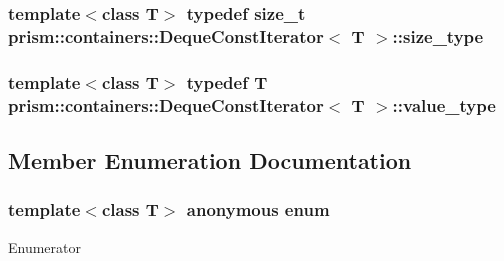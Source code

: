 \subsubsection[{\texorpdfstring{size\+\_\+type}{size_type}}]{\setlength{\rightskip}{0pt plus 5cm}template$<$class T$>$ typedef size\+\_\+t {\bf prism\+::containers\+::\+Deque\+Const\+Iterator}$<$ T $>$\+::{\bf size\+\_\+type}}\hypertarget{classprism_1_1containers_1_1_deque_const_iterator_a30b8ab79e1eb12d4b6f82dd9782ea216}{}\label{classprism_1_1containers_1_1_deque_const_iterator_a30b8ab79e1eb12d4b6f82dd9782ea216}
\subsubsection[{\texorpdfstring{value\+\_\+type}{value_type}}]{\setlength{\rightskip}{0pt plus 5cm}template$<$class T$>$ typedef T {\bf prism\+::containers\+::\+Deque\+Const\+Iterator}$<$ T $>$\+::{\bf value\+\_\+type}}\hypertarget{classprism_1_1containers_1_1_deque_const_iterator_a094727b1488122c12004cf255f3c8695}{}\label{classprism_1_1containers_1_1_deque_const_iterator_a094727b1488122c12004cf255f3c8695}


\subsection{Member Enumeration Documentation}
\subsubsection[{\texorpdfstring{anonymous enum}{anonymous enum}}]{\setlength{\rightskip}{0pt plus 5cm}template$<$class T$>$ anonymous enum}\hypertarget{classprism_1_1containers_1_1_deque_const_iterator_a6e21cb16d5a220121ed16fdd4cabe84a}{}\label{classprism_1_1containers_1_1_deque_const_iterator_a6e21cb16d5a220121ed16fdd4cabe84a}
\begin{Desc}
\item[Enumerator]\par
\begin{description}
\item[{\em 
C\+H\+U\+N\+K\+\_\+\+S\+I\+ZE\hypertarget{classprism_1_1containers_1_1_deque_const_iterator_a6e21cb16d5a220121ed16fdd4cabe84aa1aa5bd9c4d095a95b3354c4cbd7b9880}{}\label{classprism_1_1containers_1_1_deque_const_iterator_a6e21cb16d5a220121ed16fdd4cabe84aa1aa5bd9c4d095a95b3354c4cbd7b9880}
}]\end{description}
\end{Desc}


